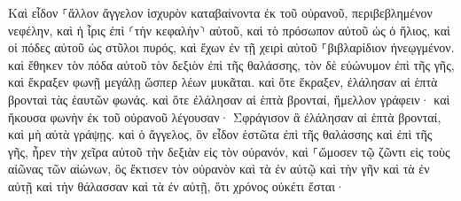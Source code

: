 \documentclass{openreader}
\begin{document}
Καὶ εἶδον ⸀ἄλλον ἄγγελον ἰσχυρὸν καταβαίνοντα ἐκ τοῦ οὐρανοῦ, περιβεβλημένον νεφέλην, καὶ ἡ ἶρις ἐπὶ ⸂τὴν κεφαλὴν⸃ αὐτοῦ, καὶ τὸ πρόσωπον αὐτοῦ ὡς ὁ ἥλιος, καὶ οἱ πόδες αὐτοῦ ὡς στῦλοι πυρός, 
καὶ ἔχων ἐν τῇ χειρὶ αὐτοῦ ⸀βιβλαρίδιον ἠνεῳγμένον. καὶ ἔθηκεν τὸν πόδα αὐτοῦ τὸν δεξιὸν ἐπὶ τῆς θαλάσσης, τὸν δὲ εὐώνυμον ἐπὶ τῆς γῆς, 
καὶ ἔκραξεν φωνῇ μεγάλῃ ὥσπερ λέων μυκᾶται. καὶ ὅτε ἔκραξεν, ἐλάλησαν αἱ ἑπτὰ βρονταὶ τὰς ἑαυτῶν φωνάς. 
καὶ ὅτε ἐλάλησαν αἱ ἑπτὰ βρονταί, ἤμελλον γράφειν· καὶ ἤκουσα φωνὴν ἐκ τοῦ οὐρανοῦ λέγουσαν· Σφράγισον ἃ ἐλάλησαν αἱ ἑπτὰ βρονταί, καὶ μὴ αὐτὰ γράψῃς. 
καὶ ὁ ἄγγελος, ὃν εἶδον ἑστῶτα ἐπὶ τῆς θαλάσσης καὶ ἐπὶ τῆς γῆς, ἦρεν τὴν χεῖρα αὐτοῦ τὴν δεξιὰν εἰς τὸν οὐρανόν, 
καὶ ⸀ὤμοσεν τῷ ζῶντι εἰς τοὺς αἰῶνας τῶν αἰώνων, ὃς ἔκτισεν τὸν οὐρανὸν καὶ τὰ ἐν αὐτῷ καὶ τὴν γῆν καὶ τὰ ἐν αὐτῇ καὶ τὴν θάλασσαν καὶ τὰ ἐν αὐτῇ, ὅτι χρόνος οὐκέτι ἔσται· 
\end{document}
